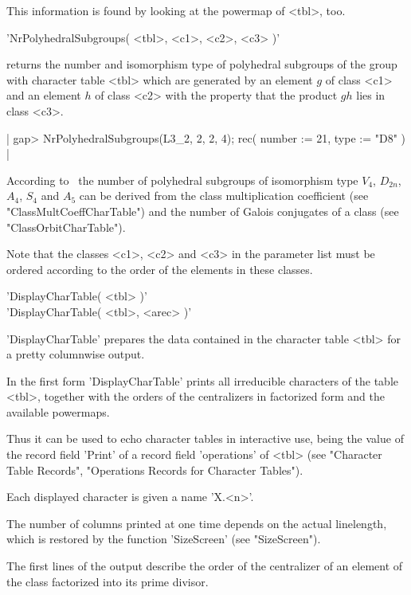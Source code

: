 This information is found by looking at the powermap of <tbl>, too.

%

'NrPolyhedralSubgroups( <tbl>, <c1>, <c2>, <c3> )'

returns the  number  and isomorphism type  of polyhedral subgroups of the
group with character table <tbl> which are generated by an element $g$ of
class <c1> and an element  $h$ of class <c2> with  the  property that the
product $gh$ lies in class <c3>.

|    gap> NrPolyhedralSubgroups(L3_2, 2, 2, 4);
    rec(
      number := 21,
      type := "D8" ) |

According to~\cite[p.~233]{NPP84} the  number of polyhedral  subgroups of
isomorphism type $V_4$, $D_{2n}$, $A_4$, $S_4$ and  $A_5$  can be derived
from the class multiplication coefficient (see "ClassMultCoeffCharTable")
and    the   number   of    Galois   conjugates   of   a    class    (see
"ClassOrbitCharTable").

Note that the classes <c1>,  <c2> and <c3> in the parameter list  must be
ordered according to the order of the elements in these classes.

%

'DisplayCharTable( <tbl> )' \\
'DisplayCharTable( <tbl>, <arec> )'

'DisplayCharTable' prepares the data contained in the character table
<tbl> for a pretty columnwise output.

In the first form 'DisplayCharTable' prints all irreducible characters
of the table <tbl>, together with the orders of the centralizers in
factorized form and the available powermaps.

Thus it can be used  to echo character tables in interactive use, being
the value of the record field 'Print' of a record field 'operations'
of <tbl> (see "Character Table Records",
"Operations Records for Character Tables").

Each displayed character is given a name 'X.<n>'.

The number of columns printed at one time depends on the actual
linelength, which is restored by the function 'SizeScreen' (see
"SizeScreen").

The first lines of the output describe the order of the centralizer
of an element of the class factorized into its prime divisor.

